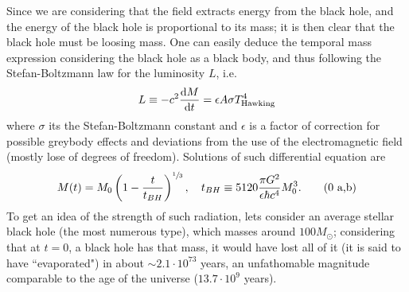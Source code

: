 Since we are considering that the field extracts energy from the black hole, and the energy of the black hole is proportional to its mass; it is then clear that the black hole must be loosing mass. One can easily deduce the temporal mass expression considering the black hole as a black body, and thus following the Stefan-Boltzmann law for the luminosity $L$, i.e.
\begin{equation}
	L\equiv-c^2\frac{\text{d} M}{\text{d} t}=\epsilon A \sigma T^4_{\text{Hawking}}
\end{equation}
where $\sigma$ its the Stefan-Boltzmann constant and $\epsilon$ is a factor of correction for possible greybody effects and deviations from the use of the electromagnetic field (mostly lose of degrees of freedom). Solutions of such differential equation are
\begin{subequations}
	\begin{gather}
		M(t)=M_0\left(1-\frac{t}{t_{BH}}\right)^{\sfrac{1}{3}},\quad t_{BH}\equiv 5120\frac{\pi G^2}{\epsilon\hbar c^4}M_0^3.\tag{\theequation \,\,a,b}
	\end{gather}
\end{subequations}
To get an idea of the strength of such radiation, lets consider an average stellar black hole (the most numerous type), which masses around $100M_\odot$; considering that at $t=0$, a black hole has that mass, it would have lost all of it (it is said to have ``evaporated") in about $\sim 2.1\cdot10^{73}$ years, an unfathomable magnitude comparable to the age of the universe ($13.7\cdot 10^{9}$ years).
